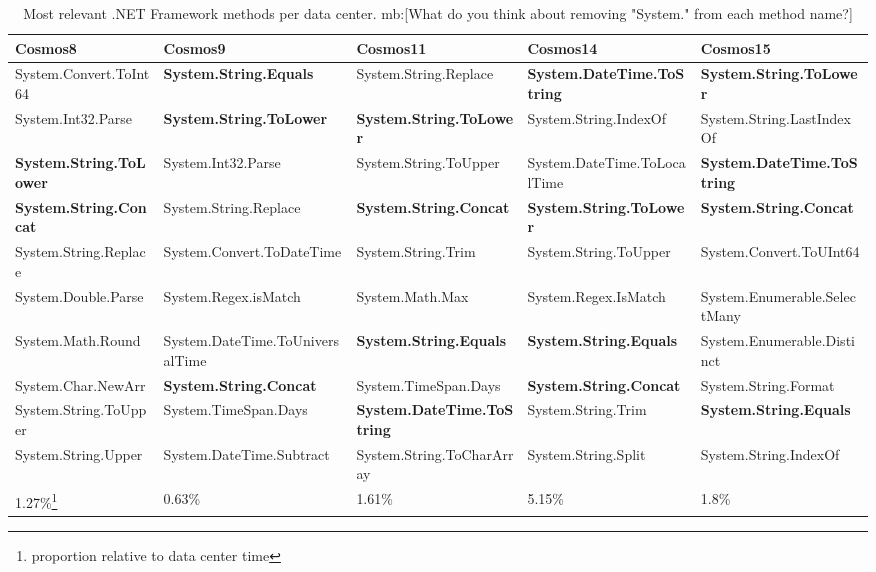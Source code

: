 \begin{table}[ht]
\small
 \begin{tabular}{@{}llllp{3.5cm}@{}}

  Cosmos8 & Cosmos9 & Cosmos11 & Cosmos14 & Cosmos15 \\
 \midrule
System.Convert.ToInt64 & \textbf{System.String.Equals} & System.String.Replace & \textbf{System.DateTime.ToString} & \textbf{System.String.ToLower} \\
System.Int32.Parse & \textbf{System.String.ToLower} & \textbf{System.String.ToLower} & System.String.IndexOf & System.String.LastIndexOf \\
\textbf{System.String.ToLower} & System.Int32.Parse & System.String.ToUpper & System.DateTime.ToLocalTime & \textbf{System.DateTime.ToString}\\
\textbf{System.String.Concat} & System.String.Replace & \textbf{System.String.Concat} & \textbf{System.String.ToLower} & \textbf{System.String.Concat}\\
System.String.Replace & System.Convert.ToDateTime & System.String.Trim & System.String.ToUpper & System.Convert.ToUInt64 \\
System.Double.Parse & System.Regex.isMatch & System.Math.Max & System.Regex.IsMatch & System.Enumerable.SelectMany \\
System.Math.Round& System.DateTime.ToUniversalTime & \textbf{System.String.Equals} & \textbf{System.String.Equals} & System.Enumerable.Distinct \\
System.Char.NewArr & \textbf{System.String.Concat} & System.TimeSpan.Days & \textbf{System.String.Concat} & System.String.Format \\
System.String.ToUpper & System.TimeSpan.Days & \textbf{System.DateTime.ToString} & System.String.Trim & \textbf{System.String.Equals}\\
System.String.Upper & System.DateTime.Subtract & System.String.ToCharArray & System.String.Split & System.String.IndexOf \\

\midrule
1.27\%\footnote{proportion relative to data center time} & 0.63\% & 1.61\% & 5.15\% & 1.8\%\\
\midrule

\end{tabular}
 \label{tb:rankedMethods}
\caption{Most relevant .NET Framework methods per data center. {\sc mb:[What do you think about removing "System." from each method name?]}}
\end{table}


